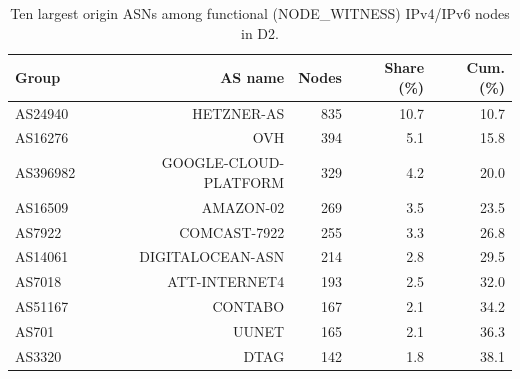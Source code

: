 \begin{table}[t]
\centering\small
\caption{Ten largest origin ASNs among functional (NODE\_WITNESS) IPv4/IPv6 nodes in D2.}
\label{tab:topasn}

\begin{tabular}{lrrrr}
\toprule
Group & AS name & Nodes & Share (\%) & Cum. (\%) \\
\midrule
AS24940 & HETZNER-AS & 835 & 10.7 & 10.7 \\
AS16276 & OVH & 394 & 5.1 & 15.8 \\
AS396982 & GOOGLE-CLOUD-PLATFORM & 329 & 4.2 & 20.0 \\
AS16509 & AMAZON-02 & 269 & 3.5 & 23.5 \\
AS7922 & COMCAST-7922 & 255 & 3.3 & 26.8 \\
AS14061 & DIGITALOCEAN-ASN & 214 & 2.8 & 29.5 \\
AS7018 & ATT-INTERNET4 & 193 & 2.5 & 32.0 \\
AS51167 & CONTABO & 167 & 2.1 & 34.2 \\
AS701 & UUNET & 165 & 2.1 & 36.3 \\
AS3320 & DTAG & 142 & 1.8 & 38.1 \\
\bottomrule
\end{tabular}
\end{table}

